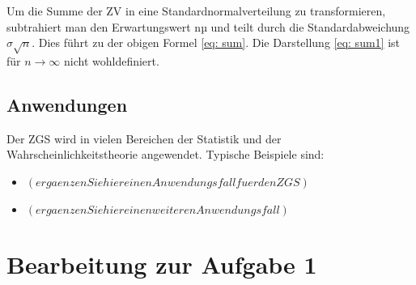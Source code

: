 \documentclass{article}
\begin{document}
Um die Summe der ZV in eine Standardnormalverteilung zu transformieren, subtrahiert man den Erwartungswert nµ und teilt durch die Standardabweichung $\sigma \sqrt{n}$. Dies führt zu der obigen Formel \eqref{eq: sum}. Die Darstellung \eqref{eq: sum1} ist für ${n \to \infty}$ nicht wohldefiniert.

\subsection{Anwendungen}

Der ZGS wird in vielen Bereichen der Statistik und der Wahrscheinlichkeitstheorie angewendet. Typische Beispiele sind:
\begin{itemize}
    \item  $(ergaenzen Sie  hier  einen  Anwendungsfall  fuer  den  ZGS)$
    \item $(ergaenzen  Sie hier einen weiteren Anwendungsfall)$
    
\end{itemize}

\newpage
\section{Bearbeitung zur Aufgabe 1}
\end{document}
